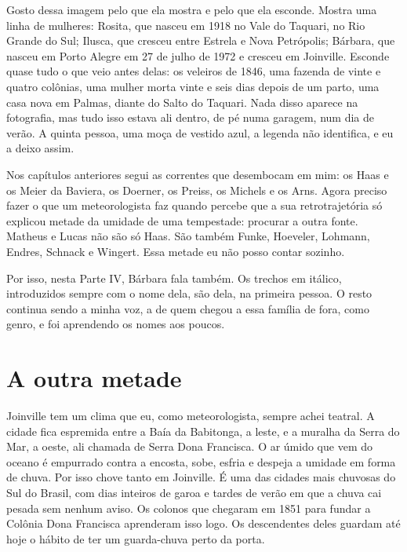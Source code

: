 \documentclass[
  brazilian,
  11pt,
  openany]{book}
\begin{document}
Gosto dessa imagem pelo que ela mostra e pelo que ela esconde. Mostra
uma linha de mulheres: Rosita, que nasceu em 1918 no Vale do Taquari, no
Rio Grande do Sul; Ilusca, que cresceu entre Estrela e Nova Petrópolis;
Bárbara, que nasceu em Porto Alegre em 27 de julho de 1972 e cresceu em
Joinville. Esconde quase tudo o que veio antes delas: os veleiros de
1846, uma fazenda de vinte e quatro colônias, uma mulher morta vinte e
seis dias depois de um parto, uma casa nova em Palmas, diante do Salto
do Taquari. Nada disso aparece na fotografia, mas tudo isso estava ali
dentro, de pé numa garagem, num dia de verão. A quinta pessoa, uma moça
de vestido azul, a legenda não identifica, e eu a deixo assim.

Nos capítulos anteriores segui as correntes que desembocam em mim: os
Haas e os Meier da Baviera, os Doerner, os Preiss, os Michels e os Arns.
Agora preciso fazer o que um meteorologista faz quando percebe que a sua
retrotrajetória só explicou metade da umidade de uma tempestade:
procurar a outra fonte. Matheus e Lucas não são só Haas. São também
Funke, Hoeveler, Lohmann, Endres, Schnack e Wingert. Essa metade eu não
posso contar sozinho.

Por isso, nesta Parte IV, Bárbara fala também. Os trechos em itálico,
introduzidos sempre com o nome dela, são dela, na primeira pessoa. O
resto continua sendo a minha voz, a de quem chegou a essa família de
fora, como genro, e foi aprendendo os nomes aos poucos.

\section{A outra metade}\label{a-outra-metade}

Joinville tem um clima que eu, como meteorologista, sempre achei
teatral. A cidade fica espremida entre a Baía da Babitonga, a leste, e a
muralha da Serra do Mar, a oeste, ali chamada de Serra Dona Francisca. O
ar úmido que vem do oceano é empurrado contra a encosta, sobe, esfria e
despeja a umidade em forma de chuva. Por isso chove tanto em Joinville.
É uma das cidades mais chuvosas do Sul do Brasil, com dias inteiros de
garoa e tardes de verão em que a chuva cai pesada sem nenhum aviso. Os
colonos que chegaram em 1851 para fundar a Colônia Dona Francisca
aprenderam isso logo. Os descendentes deles guardam até hoje o hábito de
ter um guarda-chuva perto da porta.
\end{document}

